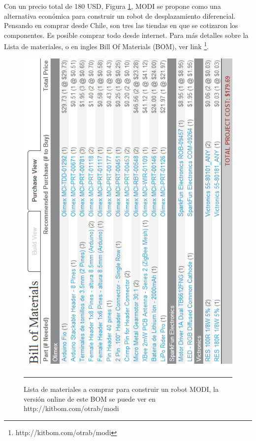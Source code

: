 Con un precio total de 180 USD, Figura \ref{fig:BOM}, MODI se propone como una alternativa económica para construir un robot de desplazamiento diferencial. Pensando en comprar desde Chile, son tres las tiendas en que se cotizaron los componentes. Es posible comprar todo desde internet. Para más detalles sobre la Lista de materiales, o en ingles Bill Of Materials (BOM), ver link \footnote{http://kitbom.com/otrab/modi}.
\begin{figure}[htbp]
	\centering
		\includegraphics[width=\textwidth]{./Figures/MODI/kitbom.png}
		\rule{35em}{0.5pt}
	\caption[Bill Of Materials]{Lista de materiales a comprar para construir un robot MODI, la versión online de este BOM se puede ver en http://kitbom.com/otrab/modi}
	\label{fig:BOM}
\end{figure}

